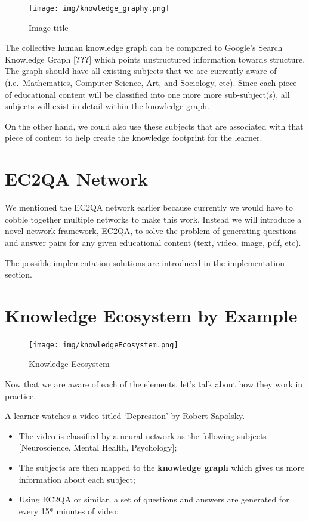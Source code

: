 \documentclass{acm_proc_article-sp}
\begin{document}
\begin{figure}
\centering
\texttt{[image: img/knowledge\_graphy.png]}
\caption{Image title}
\end{figure}

The collective human knowledge graph can be compared to Google's Search
Knowledge Graph {[}{\textbf{???}}{]} which points unstructured
information towards structure. The graph should have all existing
subjects that we are currently aware of (i.e.~Mathematics, Computer
Science, Art, and Sociology, etc). Since each piece of educational
content will be classified into one more more sub-subject(s), all
subjects will exist in detail within the knowledge graph.

On the other hand, we could also use these subjects that are associated
with that piece of content to help create the knowledge footprint for
the learner.

\section{EC2QA Network}\label{ec2qa-network}

We mentioned the EC2QA network earlier because currently we would have
to cobble together multiple networks to make this work. Instead we will
introduce a novel network framework, EC2QA, to solve the problem of
generating questions and answer pairs for any given educational content
(text, video, image, pdf, etc).

The possible implementation solutions are introduced in the
implementation section.

\section{Knowledge Ecosystem by
Example}\label{knowledge-ecosystem-by-example}

\begin{figure}
\centering
\texttt{[image: img/knowledgeEcosystem.png]}
\caption{Knowledge Ecosystem}
\end{figure}

Now that we are aware of each of the elements, let's talk about how they
work in practice.

A learner watches a video titled `Depression' by Robert Sapolsky.

\begin{itemize}
\item
  The video is classified by a neural network as the following subjects
  {[}Neuroscience, Mental Health, Psychology{]};
\item
  The subjects are then mapped to the \textbf{knowledge graph} which
  gives us more information about each subject;
\item
  Using EC2QA or similar, a set of questions and answers are generated
  for every 15* minutes of video;
\end{itemize}
\end{document}
